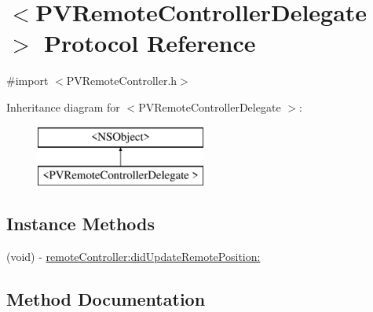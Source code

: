 \hypertarget{protocol_p_v_remote_controller_delegate_01-p}{}\section{$<$P\+V\+Remote\+Controller\+Delegate $>$ Protocol Reference}
\label{protocol_p_v_remote_controller_delegate_01-p}


{\ttfamily \#import $<$P\+V\+Remote\+Controller.\+h$>$}

Inheritance diagram for $<$P\+V\+Remote\+Controller\+Delegate $>$\+:\begin{figure}[H]
\begin{center}
\leavevmode
\includegraphics[height=2.000000cm]{protocol_p_v_remote_controller_delegate_01-p}
\end{center}
\end{figure}
\subsection*{Instance Methods}
\begin{DoxyCompactItemize}
\item 
(void) -\/ \hyperlink{protocol_p_v_remote_controller_delegate_01-p_ad628cbfe2bd3221c1bbe5c6c706d2f20}{remote\+Controller\+:did\+Update\+Remote\+Position\+:}
\end{DoxyCompactItemize}


\subsection{Method Documentation}
\mbox{\label{protocol_p_v_remote_controller_delegate_01-p_ad628cbfe2bd3221c1bbe5c6c706d2f20}} 
